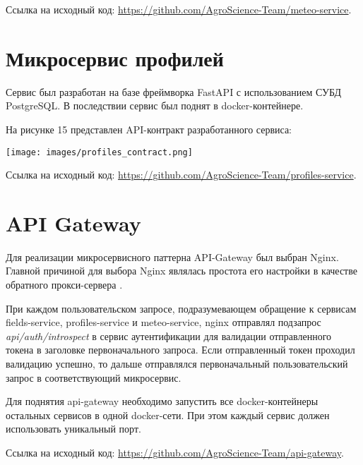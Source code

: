     Ссылка на исходный код: \url{https://github.com/AgroScience-Team/meteo-service}.


    
    \section{Микросервис профилей}

    Сервис был разработан на базе фреймворка FastAPI с использованием СУБД PostgreSQL. В последствии сервис был поднят в docker-контейнере. 
    
    На рисунке 15 представлен API-контракт разработанного сервиса:
        \noindent\begin{minipage}[t]{\textwidth}
                 \begin{center}
                 \texttt{[image: images/profiles\_contract.png]}
                 \end{center} \label{fig:Moreno}
            
            \end{minipage}
            
    Ссылка на исходный код: \url{https://github.com/AgroScience-Team/profiles-service}.
    
    \section{API Gateway}
    
    Для реализации микросервисного паттерна API-Gateway был выбран Nginx. Главной причиной для выбора Nginx являлась простота его настройки в качестве обратного прокси-сервера \cite{nginx}.
    
    При каждом пользовательском запросе, подразумевающем обращение к сервисам fields-service, profiles-service и meteo-service, nginx отправлял подзапрос \textit{api/auth/introspect} в сервис аутентификации для валидации отправленного токена в заголовке первоначального запроса. Если отправленный токен проходил валидацию успешно, то дальше отправлялся первоначальный пользовательский запрос в соответствующий микросервис.

    Для поднятия api-gateway необходимо запустить все docker-контейнеры остальных сервисов в одной docker-сети. При этом каждый сервис должен использовать уникальный порт.
    
    Ссылка на исходный код: \url{https://github.com/AgroScience-Team/api-gateway}.
    
